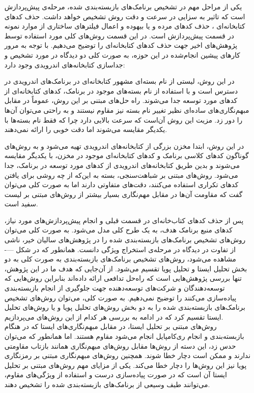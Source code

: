 یکی از مراحل مهم در تشخیص برنامک‌های بازبسته‌بندی شده، مرحله‌ی پیش‌پردازش است که تاثیر به سزایی در سرعت و دقت روش تشخیص خواهد داشت. حذف کد‌های کتابخانه‌ای ، حذف کد‌های مرده و یا بیهوده و اعمال فیلتر‌های ساختاری از موارد نمونه در قسمت پیش‌پردازش است. در این قسمت روش‌های کلی مورد استفاده توسط پژوهش‌های اخیر جهت حذف کد‌های کتابخانه‌ای را توضیح می‌دهیم. با توجه به مرور کار‌های پیشین انجام‌شده در این حوزه، به صورت کلی دو دیدگاه در مورد تشخیص و جداسازی کتابخانه‌های اندرویدی وجود دارد: 

  در این روش، لیستی از نام بسته‌ای مشهور کتابخانه‌ای در برنامک‌های اندرویدی در دسترس است و با استفاده از نام بسته‌های موجود در برنامک، کد‌های کتابخانه‌ای از کد‌های مورد توسعه جدا می‌شوند. راه‌ حل‌های مبتنی بر این روش، عموماً در مقابل مبهم‌نگاری‌های ساده‌ای نظیر تغییر نام بسته نیز مقاوم نیستند و به راحتی می‌توان آن‌ها را دور زد. مزیت این روش آن‌است که سرعت بالایی دارد چرا که فقط نام بسته‌ها با یکدیگر مقایسه می‌شوند اما دقت خوبی را ارائه نمی‌دهند.

  در این روش، ابتدا مخزن بزرگی از کتابخانه‌های اندرویدی تهیه می‌شود و به روش‌های گوناگون کد‌های کلاسی برنامک و کد‌های کتابخانه‌ای موجود در مخزن، با یکدیگر مقایسه می‌شوند و بدین طریق کتابخانه‌های اندرویدی از کد‌های مورد توسعه در برنامک، جدا می‌شود. روش‌های مبتنی بر شباهت‌سنجی، بسته به این‌که از چه روشی برای یافتن کد‌های تکراری استفاده می‌کنند، دقت‌های متفاوتی دارند اما به صورت کلی می‌توان گفت که مقاومت آن‌ها در مقابل مهم‌نگاری بسیار بیشتر از روش‌های مبتنی بر لیست سفید است.


پس از حذف کد‌های کتاب‌خانه‌ای در قسمت قبلی و انجام پیش‌پردازش‌های مورد نیاز، کد‌های منبع برنامک هدف، به یک طرح کلی مدل می‌شود. به صورت کلی می‌توان روش‌های تشخیص برنامک‌های بازبسته‌بندی شده را در پژوهش‌های سالیان خیر، ناشی از تفاوت در دیدگاه در مرحله‌ی استخراج ویژگی دانست. همانطور که در شکل ---- مشاهده می‌شود، روش‌های تشخیص برنامک‌های بازبسته‌بندی به صورت کلی به دو بخش تحلیل ایستا و تحلیل پویا تقسیم می‌شود. از آن‌جایی که هدف ما در این پژوهش، تنها بررسی پژوهش‌هایی است که راه‌حل تدافعی ارائه داده‌اند بنابراین روش‌هایی که توسعه‌دهندگان و شرکت‌های توسعه‌دهنده جهت جلوگیری از انجام بازبسته‌بندی پیاده‌سازی می‌کنند را توضیح نمی‌دهیم. به صورت کلی، می‌توان روش‌های تشخیص برنامک‌های بازبسته‌بندی شده را به دو بخش روش‌های تحلیل پویا و یا روش‌های تحلیل ایستا تقسیم کرد که در ادامه به بررسی هر کدام از این روش‌های می‌پردازیم. \\
 روش‌های مبتنی بر تحلیل ایستا، در مقابل مبهم‌نگاری‌‌های ایستا که در هنگام بازبسته‌بندی و انجام ری‌کامپایل انجام می‌شود مقاوم هستند. اما همانطور که می‌توان حدس زد، این دسته از روش‌ها مقابل روش‌های مبهم‌نگاری همانند بازتاب مقاومتی ندارند و ممکن است دچار خطا شوند. همچنین روش‌های مبهم‌نگاری مبتنی بر رمز‌نگاری پویا نیز این روش‌‌ها را دچار خطا می‌کند. یکی از مزایای مهم روش‌های مبتنی بر تحلیل ایستا آن است که در صورت پیاده‌سازی درست و استفاده از ویژگی‌های مقاوم، می‌توانند طیف وسیعی از برنامک‌های بازبسته‌بندی شده را تشخیص دهند. 

